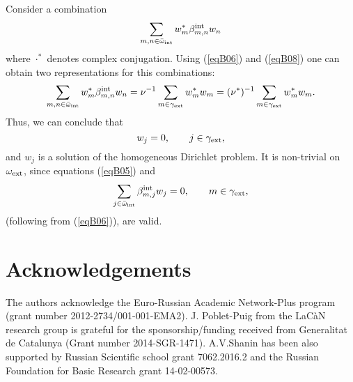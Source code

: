\documentclass[12pt]{article}
\newcommand{\rin}{{\rm int}}
\newcommand{\rex}{{\rm ext}}
\begin{document}
Consider a combination
\[
\sum_{m,n \in \bar \omega_\rin}
w^*_m \beta^\rin_{m,n} w_n
\]
where $\cdot^*$ denotes complex conjugation. Using (\ref{eqB06}) and (\ref{eqB08}) one can obtain
two representations for this combinations:
\begin{equation}
\sum_{m,n \in \bar \omega_\rin}
w^*_m \beta^\rin_{m,n} w_n =
\nu^{-1} \sum_{m \in \gamma_\rex}  w^*_m w_m =
(\nu^*)^{-1} \sum_{m \in \gamma_\rex} w^*_m w_m.
\label{eq09}
\end{equation}
Thus, we can conclude that
\begin{equation}
w_j = 0 ,
\qquad
j \in \gamma_\rex,
\label{eqB10}
\end{equation}
and $w_j$ is a solution of the homogeneous Dirichlet problem. It is non-trivial on $\omega_\rex$,
since equations (\ref{eqB05}) and
\begin{equation}
\sum_{j \in \bar \omega_\rin} \beta^\rin_{m,j} w_j =0 ,
\qquad
m \in \gamma_\rex,
\label{eqB11}
\end{equation}
(following from (\ref{eqB06})), are valid.

\section*{Acknowledgements}
The authors acknowledge the Euro-Russian Academic Network-Plus program (grant number 2012-2734/001-001-EMA2). J. Poblet-Puig from the LaC\`{a}N research group is grateful for the sponsorship/funding received from Generalitat de Catalunya (Grant number 2014-SGR-1471).
A.V.Shanin has been also supported by Russian Scientific school grant 7062.2016.2 and the Russian Foundation for Basic Research grant 14-02-00573.



\end{document}
